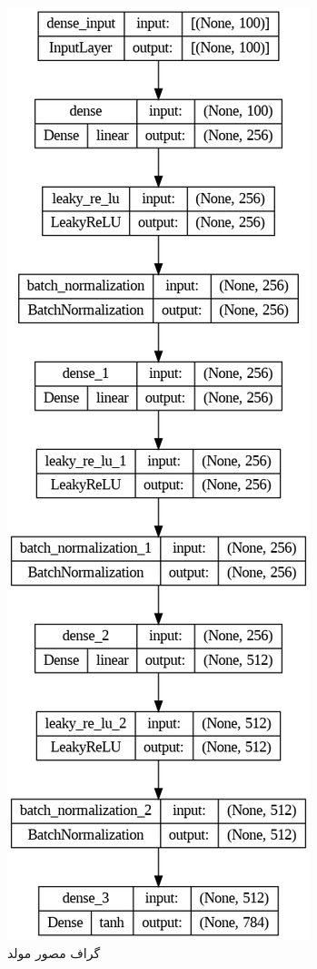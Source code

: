 \documentclass{article}
\begin{document}
\begin{figure}[!h]
    \centering\includegraphics[scale=.55]{./gen-2}
    \caption{گراف مصور مولد}\label{fig.32}
\end{figure}
\end{document}
